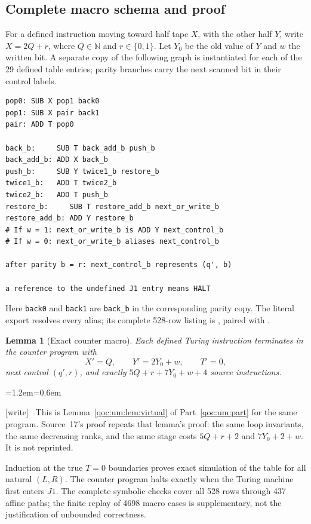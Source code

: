 \documentclass[11pt,letterpaper]{article}
\newtheorem{lemma}[theorem]{Lemma}
\theoremstyle{definition}
\theoremstyle{remark}
\newcommand{\N}{\mathbb N}
\newcommand{\rncode}[1]{\texttt{#1}}
\newcommand{\wtag}{\textup{[write]}}
\newenvironment{writenote}{\par\smallskip\begin{list}{}{\leftmargin=1.2em\rightmargin=0.6em}\item[]\small\wtag\ }{\end{list}\smallskip}
\begin{document}
\subsection{Complete macro schema and proof}
For a defined instruction moving toward half tape $X$, with the other half $Y$, write $X=2Q+r$, where $Q\in\N$ and $r\in\{0,1\}$. Let $Y_0$ be the old value of $Y$ and $w$ the written bit. A separate copy of the following graph is instantiated for each of the 29 defined table entries; parity branches carry the next scanned bit in their control labels.
\begin{lstlisting}
pop0: SUB X pop1 back0
pop1: SUB X pair back1
pair: ADD T pop0

back_b:     SUB T back_add_b push_b
back_add_b: ADD X back_b
push_b:     SUB Y twice1_b restore_b
twice1_b:   ADD T twice2_b
twice2_b:   ADD T push_b
restore_b:     SUB T restore_add_b next_or_write_b
restore_add_b: ADD Y restore_b
# If w = 1: next_or_write_b is ADD Y next_control_b
# If w = 0: next_or_write_b aliases next_control_b

after parity b = r: next_control_b represents (q', b)

a reference to the undefined J1 entry means HALT
\end{lstlisting}
Here \rncode{back0} and \rncode{back1} are \rncode{back\_b} in the corresponding parity copy. The literal export resolves every alias; its complete 528-row listing is , paired with .

\begin{lemma}[Exact counter macro]
Each defined Turing instruction terminates in the counter program with
\[
 X'=Q,\qquad Y'=2Y_0+w,\qquad T'=0,
\]
next control $(q',r)$, and exactly $5Q+r+7Y_0+w+4$ source instructions.
\end{lemma}
\begin{writenote}
This is Lemma~\ref{qoc:um:lem:virtual} of Part~\ref{qoc:um:part} for the same program. Source~17's proof repeats that lemma's proof: the same loop invariants, the same decreasing ranks, and the same stage costs $5Q+r+2$ and $7Y_0+2+w$. It is not reprinted.
\end{writenote}

Induction at the true $T=0$ boundaries proves exact simulation of the table for all natural $(L,R)$. The counter program halts exactly when the Turing machine first enters $J1$. The complete symbolic checks cover all 528 rows through 437 affine paths; the finite replay of 4698 macro cases is supplementary, not the justification of unbounded correctness.
\end{document}
